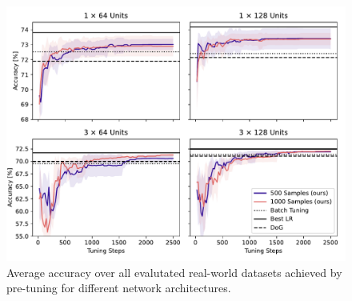 \documentclass[runningheads]{llncs}
\begin{document}
\begin{figure}
    \centering
    \includegraphics[width=\textwidth]{figures/pretune_architectures_exp_schedule.pdf}
    \caption{Average accuracy over all evalutated real-world datasets achieved by pre-tuning for different network architectures.}
\end{figure}
\end{document}
